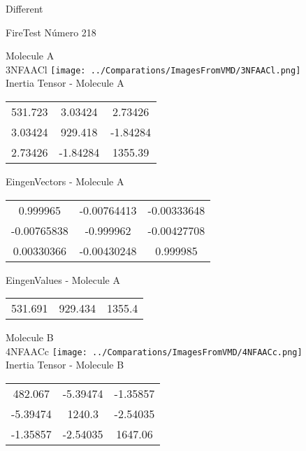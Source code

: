 \begin{center}
\vtab
\vtab
\textcolor{NavyBlue}{\Large Different}
\end{center}

 \newpage

\vtab[-2cm]
\begin{center}
{\large FireTest \tab Número 218}
\end{center}
\begin{multicols}{2}
\begin{center}

Molecule A \\ 
3NFAACl
\texttt{[image: ../Comparations/ImagesFromVMD/3NFAACl.png]}
\\
Inertia Tensor - Molecule A \\
\vtab

\begin{tabular}{|c c c|}
531.723	 & 	3.03424	 & 	2.73426	 \\
3.03424	 & 	929.418	 & 	-1.84284	 \\
2.73426	 & 	-1.84284	 & 	1355.39
\end{tabular}

\vtab
 EingenVectors - Molecule A     \\
\vtab
\begin{tabular}{|c c c|}
0.999965	 & 	-0.00764413	 & 	-0.00333648	 \\
-0.00765838	 & 	-0.999962	 & 	-0.00427708	 \\
0.00330366	 & 	-0.00430248	 & 	0.999985
\end{tabular}

\vtab
 EingenValues - Molecule A     \\
\vtab
\begin{tabular}{|c c c|}
531.691	 & 	929.434	 & 	1355.4	 \\
\end{tabular}
\columnbreak

Molecule B \\ 
4NFAACc
\texttt{[image: ../Comparations/ImagesFromVMD/4NFAACc.png]}
\\
Inertia Tensor - Molecule B \\
\vtab

\begin{tabular}{|c c c|}
482.067	 & 	-5.39474	 & 	-1.35857	 \\
-5.39474	 & 	1240.3	 & 	-2.54035	 \\
-1.35857	 & 	-2.54035	 & 	1647.06
\end{tabular}


\end{center}
\end{multicols}
